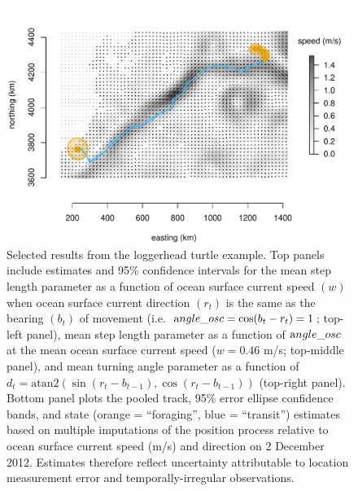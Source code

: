 \documentclass[12pt]{article}\usepackage[]{graphicx}\usepackage[]{color}
\begin{document}
\begin{figure}[htbp]
    \includegraphics[width=\textwidth]{plot_turtleResults2.pdf}
  \caption{Selected results from the loggerhead turtle example. Top panels include estimates and 95\% confidence intervals for the mean step length parameter as a function of ocean surface current speed $(w)$ when ocean surface current direction $(r_t)$ is the same as the bearing $(b_t)$ of movement (i.e.\ ${\text angle\_osc}=\cos(b_t-r_t)=1$; top-left panel), mean step length parameter as a function of ${\text angle\_osc}$ at the mean ocean surface current speed ($w=0.46$ m/s; top-middle panel), and mean turning angle parameter as a function of $d_t=\text{atan2}(\sin(r_t-b_{t-1}),\cos(r_t-b_{t-1}))$ (top-right panel). Bottom panel plots the pooled track, 95\% error ellipse confidence bands, and state (orange = ``foraging'', blue = ``transit'') estimates based on multiple imputations of the position process relative to ocean surface current speed (m/s) and direction on 2 December 2012. Estimates therefore reflect uncertainty attributable to location measurement error and temporally-irregular observations.}
  \label{fig:turtleResults}
\end{figure}
\end{document}
